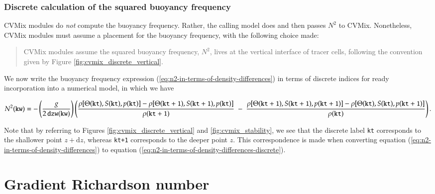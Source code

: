\subsubsection{Discrete calculation of the squared buoyancy frequency}
\label{subsubsection:numerics-buoyancy-frequency}

CVMix modules do {\it not} compute the buoyancy frequency.  Rather,
the calling model does and then passes $N^{2}$ to CVMix. Nonetheless,
CVMix modules must assume a placement for the buoyancy frequency, with
the following choice made:
\begin{mdframed}[backgroundcolor=lightgray!50]
\begin{quote}
  {\sf CVMix modules assume the squared buoyancy frequency, $N^{2}$,
      lives at the vertical interface of tracer cells, following the
      convention given by Figure \ref{fig:cvmix_discrete_vertical}.}
\end{quote}
\end{mdframed}
We now write the buoyancy frequency expression
(\ref{eq:n2-in-terms-of-density-differences}) in terms of discrete
indices for ready incorporation into a numerical model, in which we have 
\scriptsize
\begin{mdframed}[backgroundcolor=lightgray!50]
\begin{equation}
N^{2}({\tt kw}) = 
 -\left( \frac{g}{2 \,  {\tt dzw(kw)} } \right) 
  \left( 
 \frac{
    \rho[ \Theta( {\tt kt}), S( {\tt kt}), p( {\tt kt})]
  -\rho[ \Theta( {\tt kt+1} ), S({\tt kt +1} ), p( {\tt kt} )]
  }{\rho({\tt kt+1} ) }
 \; -  \; 
 \frac{ \rho[ \Theta({\tt kt+1}), S({\tt kt+1}), p({\tt kt+1})]-
 \rho[ \Theta({\tt kt} ), S( {\tt kt}), p({\tt kt+1})]
  }{\rho( {\tt kt}) }
 \right).
\label{eq:n2-in-terms-of-density-differences-discrete}
\end{equation}
\end{mdframed}
\normalsize Note that by referring to Figures
\ref{fig:cvmix_discrete_vertical} and \ref{fig:cvmix_stability}, we
see that the discrete label {\tt kt} corresponds to the shallower
point $z+\mathrm{d}z$, whereas {\tt kt+1} corresponds to the deeper
point $z$.  This correspondence is made when converting equation
(\ref{eq:n2-in-terms-of-density-differences}) to
equation (\ref{eq:n2-in-terms-of-density-differences-discrete}).


\section{Gradient Richardson number}
\label{section:gradient-richardson-number-elements}

